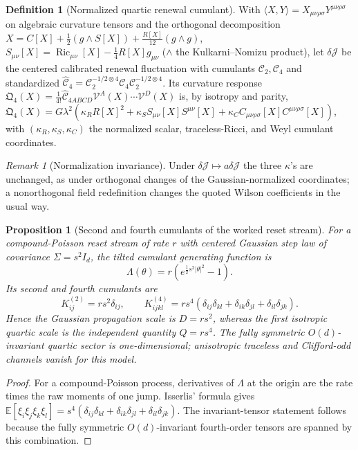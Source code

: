 \documentclass[11pt]{article}
\newtheorem{proposition}[theorem]{Proposition}
\theoremstyle{definition}
\newtheorem{definition}[theorem]{Definition}
\theoremstyle{remark}
\newtheorem{remark}[theorem]{Remark}
\newcommand{\Ric}{\operatorname{Ric}}
\begin{document}
\begin{definition}[Normalized quartic renewal cumulant]
\label{def:normalized-quartic-cumulant}
With $\langle X,Y\rangle=X_{\mu\nu\rho\sigma}Y^{\mu\nu\rho\sigma}$ on algebraic
curvature tensors and the orthogonal decomposition
$X=C[X]+\tfrac12(g\mathbin{\wedge}S[X])+\tfrac{R[X]}{12}(g\mathbin{\wedge}g)$,
$S_{\mu\nu}[X]=\Ric_{\mu\nu}[X]-\tfrac14R[X]g_{\mu\nu}$ ($\mathbin{\wedge}$ the
Kulkarni--Nomizu product), let $\delta\mathcal J$ be the centered calibrated renewal
fluctuation with cumulants $\mathcal C_2,\mathcal C_4$ and standardized
$\widehat{\mathcal C}_4=\mathcal C_2^{-1/2\otimes4}\mathcal C_4\mathcal C_2^{-1/2\otimes4}$.
Its curvature response
$\mathfrak Q_4(X)=\tfrac1{4!}\widehat{\mathcal C}_{4ABCD}\mathcal V^A(X)\cdots\mathcal V^D(X)$
is, by isotropy and parity,
$\mathfrak Q_4(X)=G\lambda^2(\kappa_R R[X]^2+\kappa_S S_{\mu\nu}[X]S^{\mu\nu}[X]
+\kappa_C C_{\mu\nu\rho\sigma}[X]C^{\mu\nu\rho\sigma}[X])$, with
$(\kappa_R,\kappa_S,\kappa_C)$ the normalized scalar, traceless-Ricci, and Weyl
cumulant coordinates.
\end{definition}

\begin{remark}[Normalization invariance]
\label{rem:cumulant-normalization-invariance}
Under $\delta\mathcal J\mapsto a\delta\mathcal J$ the three $\kappa$'s are unchanged,
as under orthogonal changes of the Gaussian-normalized coordinates; a nonorthogonal
field redefinition changes the quoted Wilson coefficients in the usual way.
\end{remark}


\begin{proposition}[Second and fourth cumulants of the worked reset stream]
\label{prop:worked-channel-cumulants}
For a compound-Poisson reset stream of rate $r$ with centered Gaussian step law
of covariance $\Sigma=s^2I_d$, the tilted cumulant generating function is
\[
 \Lambda(\theta)=r\left(e^{\frac12s^2|\theta|^2}-1\right).
\]
Its second and fourth cumulants are
\[
 K^{(2)}_{ij}=rs^2\delta_{ij},\qquad
 K^{(4)}_{ijkl}=rs^4
 (\delta_{ij}\delta_{kl}+\delta_{ik}\delta_{jl}+\delta_{il}\delta_{jk}).
\]
Hence the Gaussian propagation scale is $D=rs^2$, whereas the first isotropic
quartic scale is the independent quantity $Q=rs^4$.  The fully symmetric
$O(d)$-invariant quartic sector is one-dimensional; anisotropic traceless and
Clifford-odd channels vanish for this model.
\end{proposition}

\begin{proof}
For a compound-Poisson process, derivatives of $\Lambda$ at the origin are the
rate times the raw moments of one jump.  Isserlis' formula gives
$\mathbb E[\xi_i\xi_j\xi_k\xi_l]=s^4(\delta_{ij}\delta_{kl}+
\delta_{ik}\delta_{jl}+\delta_{il}\delta_{jk})$.  The invariant-tensor statement
follows because the fully symmetric $O(d)$-invariant fourth-order tensors are
spanned by this combination.
\end{proof}
\end{document}
